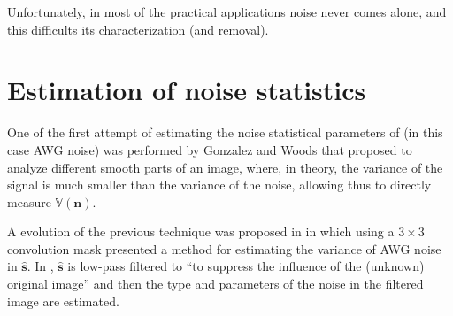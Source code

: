 Unfortunately, in most of the practical applications noise never comes
alone, and this difficults its characterization (and removal).

\begin{comment}
Noise can be additive or multiplicative. In the first case, noise is
signal independent between samples of the same signal instance, and
between samples of different instances, even if we consider the same
sample index. In the second case, the power of the noise depends on
the power of the signal, and therefore, if we can estimate the signal,
we can estimate, for example, the local variance of the noise after
supposing some statistical model. Notice, however, that in any case,
we must known, at least two (inevitable noisy) instances of the clean
signal.
\end{comment}

\begin{comment}
This requirement often presents a significant
challenge, particularly in contexts where samples are susceptible to
the degradation caused by the microscope radiation, thereby limiting
the feasibility of acquiring multiple such instances.

When this is not possible, one way to simulate having two or more
noisy instances of the same clean signal is to distribute the
pixels/voxels across two or more images/volumes (see Appendices
\ref{sec:EOS}, \ref{sec:CBS}, \ref{sec:ICBS}, \ref{sec:SCBS}, and
\ref{sec:SPRS}). Unfortunately, the splitting reduces the spatial
resolution at which the signal/noise parameters can be successfully
estudied.
\end{comment}


\section{Estimation of noise statistics}
One of the first attempt of estimating the noise statistical
parameters of (in this case \gls{AWG} noise) was performed by Gonzalez
and Woods \cite{gonzalez1992digital} that proposed to analyze
different smooth parts of an image, where, in theory, the variance of
the signal is much smaller than the variance of the noise, allowing
thus to directly measure $\mathbb{V}(\mathbf{n})$.

A evolution of the previous technique was proposed in
\cite{immerkaer1996fast} in which using a $3\times 3$ convolution mask
presented a method for estimating the variance of \gls{AWG} noise in
$\hat{\mathbf{s}}$. In \cite{rank1999estimation}, $\hat{\mathbf{s}}$
is low-pass filtered to ``to suppress the influence of the (unknown)
original image'' and then the type and parameters of the noise in the
filtered image are estimated.

